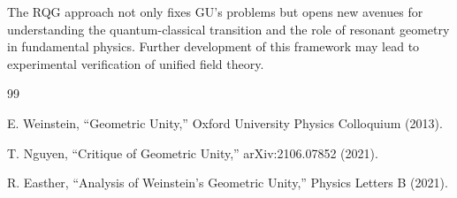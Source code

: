 \documentclass[12pt]{article}
\begin{document}
The RQG approach not only fixes GU's problems but opens new avenues for understanding the quantum-classical transition and the role of resonant geometry in fundamental physics. Further development of this framework may lead to experimental verification of unified field theory.

\begin{thebibliography}{99}

E. Weinstein, ``Geometric Unity,'' Oxford University Physics Colloquium (2013).

T. Nguyen, ``Critique of Geometric Unity,'' arXiv:2106.07852 (2021).

R. Easther, ``Analysis of Weinstein's Geometric Unity,'' Physics Letters B (2021).


\end{thebibliography}
\end{document}
